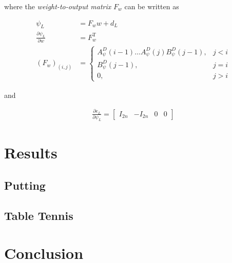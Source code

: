 \documentclass[10pt,a4paper]{article}
\newcommand{\joint}{q} %
\newcommand{\state}{\bar{\joint}} %
\newcommand{\error}{e} %
\newcommand{\traj}{r} %
\newcommand{\linDist}{d} %
\newcommand{\fullvec}{\psi} %
\newcommand{\phase}{x} %
\newcommand{\weights}{w} %
\begin{document}
where the \emph{weight-to-output matrix} $F_{\weights}$ can be written as

\begin{equation}
\begin{aligned}
\fullvec_L &= F_{\weights}\weights + \linDist_L \\
\frac{\partial{\fullvec_L}}{\partial{\weights}} &= F_{\weights}^{\mathrm{T}} \\
(F_{\weights})_{(i,j)} &= \left \{
\begin{array}{cc}
A^{D}_{\fullvec}(i-1)\ldots A^{D}_{\fullvec}(j)B^{D}_{\fullvec}(j-1), & j < i \\ 
B^{D}_{\fullvec}(j-1), & j = i \\
0, & j > i 
\end{array} \right.
\end{aligned}
\label{weightToOutputMatrix}
\end{equation}

and

\begin{equation}
\begin{aligned}
\frac{\partial{\error_L}}{\partial{\fullvec_L}} =
\begin{bmatrix}
  I_{2n} & -I_{2n} & 0 & 0
 \end{bmatrix}
\end{aligned}
\end{equation}

%
%
%

\section{Results}

\subsection{Putting}

\subsection{Table Tennis}

\section{Conclusion}


%
%

\end{document}
